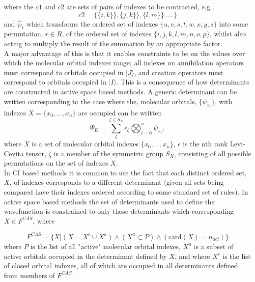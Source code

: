 where the $c1$ and $c2$ are sets of pairs of indexes to be contracted, e.g.,
\begin{equation}
c2 = \{ \{i, k\} \} , \{j, k\} \} ,\{l, m\} \}.....\} 
\end{equation}
and $\hat{\wp}_{r}$ which transforms the ordered set of indexes
$\{u,v,s,t,w,x,y,z\}$ into some permutation, $r\in R$, of the ordered set of
indexes $\{i,j,k,l,m,n,o,p\}$, whilst also acting to multiply the result of the
summation by an appropriate factor.\\

\noindent A major advantage of this is that it enables constraints to be
on the values over which the molecular orbital indexes range; all indexes on 
annihilation operators must correspond to orbitals occupied in $|J\rangle$, and 
creation operators must correspond to orbitals occupied in $|I\rangle$. 
This is a consequence of how determinants are constructed in 
active space based methods. A generic determinant can be written 
corresponding to the case where the, molecular orbitals, $\{\psi_{x_{i}}\}$,
with indexes  $X = \{x_{0},...,x_{n}\}$ are occupied can be written
\begin{equation}
\Psi_{K} = \sum^{\zeta \in S_{X}}_{\zeta} \epsilon_{\zeta} \bigotimes_{i=0}^{n}  \psi_{x_{i}},
\end{equation}
where $X$ is a set of molecular orbital indexes $\{x_{0},...,x_{n}\}$,
$\epsilon$ is the nth rank Levi-Cevita
tensor, $\zeta$ is a member of the symmetric group $S_{X}$,
consisting of all possible permutations on the set of indexes $X$.\\

\noindent In CI based methods it is common to use the fact that 
each distinct ordered set, $X$, of indexes corresponds to a different 
determinant (given all sets being compared have their indexes ordered according
to some standard set of rules). In active space based methods the set of
determinants used to define the wavefunction is constrained to only
those determinants which corresponding $X \in {F^{CAS}}$, where

\begin{equation*}
F^{CAS} = \{ X | (X = X^{c} \cup X^{a}) \wedge (X^{a} \subset P) \wedge ( \text{card}(X) = n_{act} )  \}
\end{equation*}
where $P$ is the list of all "active" molecular orbital indexes, 
$X^{a}$ is a subset of active orbitals occupied in the determinant defined by $X$, and
where $X^{c}$ is the list of closed orbital indexes, all of which are occupied in all determinants defined
from members of $F^{CAS}$.\\

